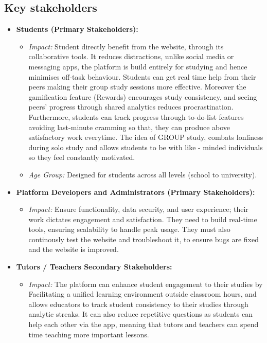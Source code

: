 \subsection{Key stakeholders}
\begin{itemize}
    \item \textbf{Students (Primary Stakeholders):}
    \begin{itemize}
        \item \textit{Impact:} Student directly benefit from the website, through its collaborative tools. It reduces distractions, unlike social media or messaging apps, the platform is build entirely for studying and hence minimises  off-task behaviour. Students can get real time help from their peers making their group study sessions more effective. Moreover the gamification feature (Rewards) encourages study consistency, and seeing peers' progress through shared analytics reduces procrastination. Furthermore, students can track progress through to-do-list features avoiding last-minute cramming so that, they can produce above satisfactory work everytime. The idea of GROUP study, combats lonliness during solo study and allows students to be with like - minded individuals so they feel constantly motivated.
        \item \textit{Age Group:} Designed for students across all levels (school to university).
    \end{itemize}
    
    \item \textbf{Platform Developers and Administrators (Primary Stakeholders):}
    \begin{itemize}
        \item \textit{Impact:} Ensure functionality, data security, and user experience; their work dictates engagement and satisfaction. They need to build real-time tools, ensuring scalability to handle peak usage. They must also continously test the website and troubleshoot it, to ensure bugs are fixed and the website is improved.
    \end{itemize}

    \item \textbf{Tutors / Teachers {Secondary Stakeholders}:}
    \begin{itemize}
        \item \textit{Impact:} The platform can enhance student engagement to their studies by Facilitating a unified learning environment outside classroom hours, and allows educators to track student consistency to their studies through analytic streaks. It can also reduce repetitive questions as students can help each other via the app, meaning that tutors and teachers can spend time teaching more important lessons.
    \end{itemize}


\end{itemize}
